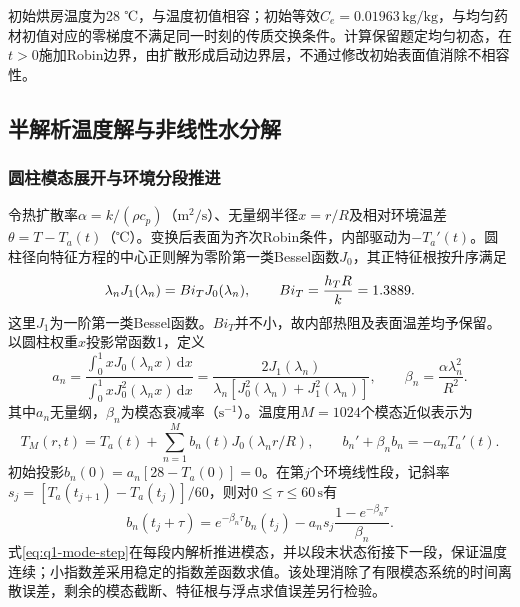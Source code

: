 初始烘房温度为28 ℃，与温度初值相容；初始等效$C_e=0.01963\,\mathrm{kg/kg}$，与均匀药材初值对应的零梯度不满足同一时刻的传质交换条件。计算保留题定均匀初态，在$t>0$施加Robin边界，由扩散形成启动边界层，不通过修改初始表面值消除不相容性。

\subsection{半解析温度解与非线性水分解}

\subsubsection{圆柱模态展开与环境分段推进}

令热扩散率$\alpha=k/(\rho c_p)$（$\mathrm{m^2/s}$）、无量纲半径$x=r/R$及相对环境温差$\theta=T-T_a(t)$（℃）。变换后表面为齐次Robin条件，内部驱动为$-T_a'(t)$。圆柱径向特征方程的中心正则解为零阶第一类Bessel函数$J_0$\cite{q1-dlmf}，其正特征根按升序满足
\begin{equation}
\lambda_nJ_1(\lambda_n)=Bi_TJ_0(\lambda_n),
\qquad Bi_T=\frac{h_TR}{k}=1.3889.
\label{eq:q1-roots}
\end{equation}
这里$J_1$为一阶第一类Bessel函数。$Bi_T$并不小，故内部热阻及表面温差均予保留。以圆柱权重$x$投影常函数1，定义
\begin{equation}
a_n=\frac{\int_0^1xJ_0(\lambda_nx)\,\mathrm dx}
           {\int_0^1xJ_0^2(\lambda_nx)\,\mathrm dx}
   =\frac{2J_1(\lambda_n)}
           {\lambda_n[J_0^2(\lambda_n)+J_1^2(\lambda_n)]},
\qquad \beta_n=\frac{\alpha\lambda_n^2}{R^2}.
\label{eq:q1-projection}
\end{equation}
其中$a_n$无量纲，$\beta_n$为模态衰减率（$\mathrm{s^{-1}}$）。温度用$M=1024$个模态近似表示为
\begin{equation}
T_M(r,t)=T_a(t)+\sum_{n=1}^{M}b_n(t)J_0(\lambda_nr/R),
\qquad b_n'+\beta_nb_n=-a_nT_a'(t).
\label{eq:q1-temperature}
\end{equation}
初始投影$b_n(0)=a_n[28-T_a(0)]=0$。在第$j$个环境线性段，记斜率$s_j=[T_a(t_{j+1})-T_a(t_j)]/60$，则对$0\le\tau\le60\,\mathrm{s}$有
\begin{equation}
b_n(t_j+\tau)=e^{-\beta_n\tau}b_n(t_j)
 -a_ns_j\frac{1-e^{-\beta_n\tau}}{\beta_n}.
\label{eq:q1-mode-step}
\end{equation}
式\eqref{eq:q1-mode-step}在每段内解析推进模态，并以段末状态衔接下一段，保证温度连续；小指数差采用稳定的指数差函数求值。该处理消除了有限模态系统的时间离散误差，剩余的模态截断、特征根与浮点求值误差另行检验。

